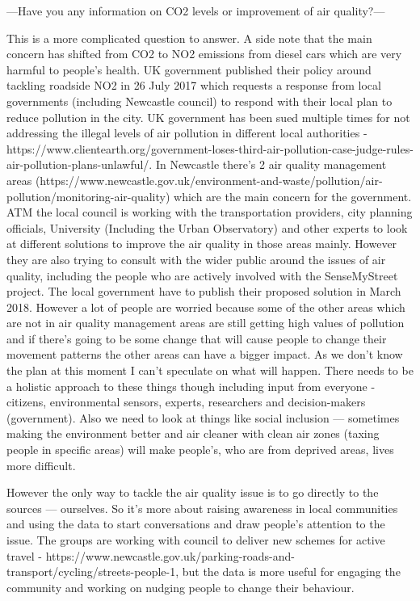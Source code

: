 ---Have you any information on CO2 levels or improvement of air quality?---

This is a more complicated question to answer. A side note that the main concern has shifted from CO2 to NO2 emissions from diesel cars which are very harmful to people’s health. UK government published their policy around tackling roadside NO2 in 26 July 2017 which requests a response from local governments (including Newcastle council) to respond with their local plan to reduce pollution in the city. UK government has been sued multiple times for not addressing the illegal levels of air pollution in different local authorities - https://www.clientearth.org/government-loses-third-air-pollution-case-judge-rules-air-pollution-plans-unlawful/. In Newcastle there’s 2 air quality management areas (https://www.newcastle.gov.uk/environment-and-waste/pollution/air-pollution/monitoring-air-quality) which are the main concern for the government. ATM the local council is working with the transportation providers, city planning officials, University (Including the Urban Observatory) and other experts to look at different solutions to improve the air quality in those areas mainly. However they are also trying to consult with the wider public around the issues of air quality, including the people who are actively involved with the SenseMyStreet project. The local government have to publish their proposed solution in March 2018. However a lot of people are worried because some of the other areas which are not in air quality management areas are still getting high values of pollution and if there’s going to be some change that will cause people to change their movement patterns the other areas can have a bigger impact. As we don’t know the plan at this moment I can’t speculate on what will happen. There needs to be a holistic approach to these things though including input from everyone - citizens, environmental sensors, experts, researchers and decision-makers (government). Also we need to look at things like social inclusion — sometimes making the environment better and air cleaner with clean air zones (taxing people in specific areas) will make people’s, who are from deprived areas, lives more difficult. 

However the only way to tackle the air quality issue is to go directly to the sources — ourselves. So it’s more about raising awareness in local communities and using the data to start conversations and draw people’s attention to the issue. The groups are working with council to deliver new schemes for active travel - https://www.newcastle.gov.uk/parking-roads-and-transport/cycling/streets-people-1, but the data is more useful for engaging the community and working on nudging people to change their behaviour.

